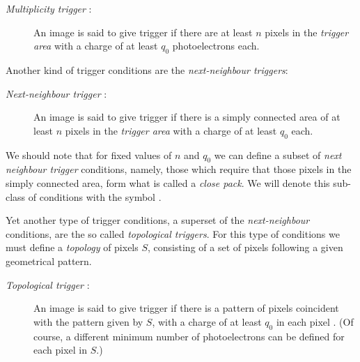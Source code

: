 \begin{description}
\item[\emph{Multiplicity trigger} :] An image is said
  to give trigger if there are at least $n$ pixels in the
  \emph{trigger area} with a charge of at least $q_0$ photoelectrons
  each.
\end{description}

\noindent
Another kind of trigger conditions are the \emph{next-neighbour
  triggers}:

\begin{description}
\item[\emph{Next-neighbour trigger} :] An image is said
  to give trigger if there is a simply connected area of at least
  $n$ pixels in the \emph{trigger area} with a charge of at least
  $q_0$ each.
\end{description}

\noindent 
We should note that for fixed values of $n$ and $q_0$ we can define a
subset of \emph{next neighbour trigger} conditions, namely, those
which require that those pixels in the simply connected area, form
what is called a \emph{close pack}. We will denote this sub-class
of conditions with the symbol .

Yet another type of trigger conditions, a superset of the
\emph{next-neighbour} conditions, are the so called \emph{topological
  triggers}. For this type of conditions we must define a
\emph{topology} of pixels $S$, consisting of a set of pixels following
a given geometrical pattern.

\begin{description}
\item[\emph{Topological trigger} :] An image is said
  to give trigger if there is a pattern of pixels coincident with the
  pattern given by $S$, with a charge of at least $q_0$ in each pixel
  .  (Of course, a different minimum number of photoelectrons can be
  defined for each pixel in $S$.)
\end{description}

